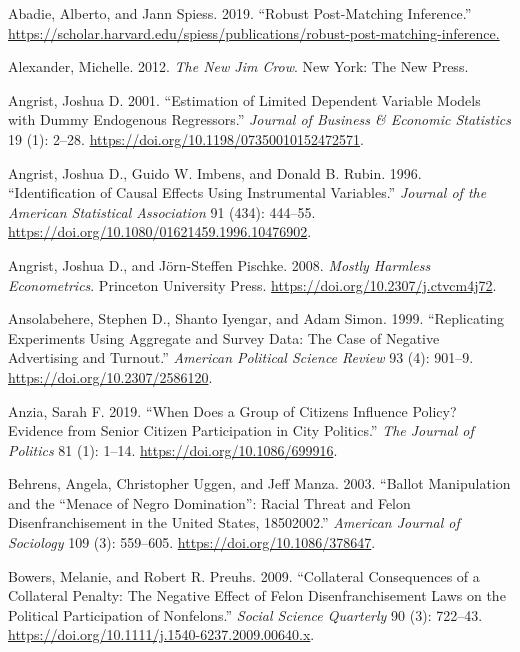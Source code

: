 \documentclass[
  12pt,
]{article}
\newlength{\cslhangindent}
\newenvironment{cslreferences}%
  {\setlength{\parindent}{0pt}%
  \everypar{\setlength{\hangindent}{\cslhangindent}}\ignorespaces}%
  {\par}
\begin{document}
\setlength{\parindent}{-0.5in}
\setlength{\leftskip}{0.5in}

\noindent

\hypertarget{refs}{}
\begin{cslreferences}
\leavevmode\hypertarget{ref-Abadie2019}{}%
Abadie, Alberto, and Jann Spiess. 2019. ``Robust Post-Matching Inference.'' \url{https://scholar.harvard.edu/spiess/publications/robust-post-matching-inference.}

\leavevmode\hypertarget{ref-Alexander2012}{}%
Alexander, Michelle. 2012. \emph{The New Jim Crow}. New York: The New Press.

\leavevmode\hypertarget{ref-Angrist2001}{}%
Angrist, Joshua D. 2001. ``Estimation of Limited Dependent Variable Models with Dummy Endogenous Regressors.'' \emph{Journal of Business \& Economic Statistics} 19 (1): 2--28. \url{https://doi.org/10.1198/07350010152472571}.

\leavevmode\hypertarget{ref-Angrist1996}{}%
Angrist, Joshua D., Guido W. Imbens, and Donald B. Rubin. 1996. ``Identification of Causal Effects Using Instrumental Variables.'' \emph{Journal of the American Statistical Association} 91 (434): 444--55. \url{https://doi.org/10.1080/01621459.1996.10476902}.

\leavevmode\hypertarget{ref-Angrist2008}{}%
Angrist, Joshua D., and Jörn-Steffen Pischke. 2008. \emph{Mostly Harmless Econometrics}. Princeton University Press. \url{https://doi.org/10.2307/j.ctvcm4j72}.

\leavevmode\hypertarget{ref-Ansolabehere1999}{}%
Ansolabehere, Stephen D., Shanto Iyengar, and Adam Simon. 1999. ``Replicating Experiments Using Aggregate and Survey Data: The Case of Negative Advertising and Turnout.'' \emph{American Political Science Review} 93 (4): 901--9. \url{https://doi.org/10.2307/2586120}.

\leavevmode\hypertarget{ref-Anzia2019}{}%
Anzia, Sarah F. 2019. ``When Does a Group of Citizens Influence Policy? Evidence from Senior Citizen Participation in City Politics.'' \emph{The Journal of Politics} 81 (1): 1--14. \url{https://doi.org/10.1086/699916}.

\leavevmode\hypertarget{ref-Behrens2003}{}%
Behrens, Angela, Christopher Uggen, and Jeff Manza. 2003. ``Ballot Manipulation and the ``Menace of Negro Domination'': Racial Threat and Felon Disenfranchisement in the United States, 18502002.'' \emph{American Journal of Sociology} 109 (3): 559--605. \url{https://doi.org/10.1086/378647}.

\leavevmode\hypertarget{ref-Bowers2009}{}%
Bowers, Melanie, and Robert R. Preuhs. 2009. ``Collateral Consequences of a Collateral Penalty: The Negative Effect of Felon Disenfranchisement Laws on the Political Participation of Nonfelons.'' \emph{Social Science Quarterly} 90 (3): 722--43. \url{https://doi.org/10.1111/j.1540-6237.2009.00640.x}.


\end{cslreferences}
\end{document}
